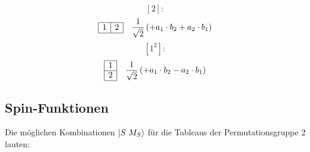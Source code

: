 \documentclass[fleqn]{article}%
\newcommand{\checkpagebreak}{\needspace{.25\textheight}}%
\begin{document}
%
\vspace{0.25cm}%
\begin{dmath*}\left[2\right]:\end{dmath*}%
\vspace{0.25cm}%
\begin{dmath*}\begin{array}{|c|c|} \hline 1 & 2\\ \cline{1-2} \end{array} \quad \frac{1}{\sqrt{2}} \left( + a_{1} \cdot b_{2}  + a_{2} \cdot b_{1}\right) \end{dmath*}%
\vspace{0.25cm}%
\vspace{0.25cm}%
\vspace{0.25cm}%
\begin{dmath*}\left[1^2\right]:\end{dmath*}%
\vspace{0.25cm}%
\begin{dmath*}\begin{array}{|c|} \hline 1\\ \cline{1-1} 2\\ \cline{1-1} \end{array} \quad \frac{1}{\sqrt{2}} \left( + a_{1} \cdot b_{2}  - a_{2} \cdot b_{1}\right) \end{dmath*}%
\vspace{0.25cm}%
\vspace{0.25cm}%
\checkpagebreak%
\subsection{Spin{-}Funktionen}%
\label{subsec:Spin{-}Funktionen}%
Die möglichen Kombinationen $\ket{S \; M_S}$ für die Tableaus der Permutationsgruppe 2 lauten:
\end{document}
